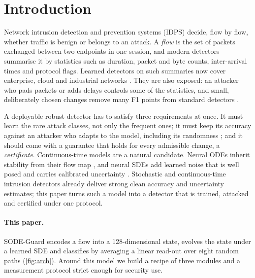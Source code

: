 \documentclass{article}
\theoremstyle{definition}
\begin{document}
\section{Introduction}\label{sec:intro}
Network intrusion detection and prevention systems (IDPS) decide, flow by flow,
whether traffic is benign or belongs to an attack. A \emph{flow} is the set of
packets exchanged between two endpoints in one session, and modern detectors
summarise it by statistics such as duration, packet and byte counts,
inter-arrival times and protocol flags. Learned detectors on such summaries now
cover enterprise, cloud and industrial networks
\citep{lo2022egraphsage,wu2022rtids,anaedevha2026mstgnn}.
They are also exposed: an attacker who pads packets or adds delays controls
some of the statistics, and small, deliberately chosen changes remove many F1
points from standard detectors \citep{ennaji2024advsurvey,vitorino2024advbench,anaedevha2024robust}.

A deployable robust detector has to satisfy three requirements at once. It must
learn the rare attack classes, not only the frequent ones; it must keep its
accuracy against an attacker who adapts to the model, including its
randomness \citep{athalye2018obfuscated,carlini2019evaluating}; and it should
come with a guarantee that holds for every admissible change, a
\emph{certificate}. Continuous-time models are a natural candidate. Neural ODEs
inherit stability from their flow map \citep{kang2021sodef}, and neural SDEs
\citep{tzen2019nsde,li2020scalable} add learned noise that is well posed and
carries calibrated uncertainty \citep{oh2024stablesde,liu2020sdenoise}.
Stochastic and continuous-time intrusion detectors
\citep{anaedevha2026ode,anaedevha2026mstgnn} already deliver
strong clean accuracy and uncertainty estimates; this paper turns such a model
into a detector that is trained, attacked and certified under one protocol.

\paragraph{This paper.} SODE-Guard encodes a flow into a 128-dimensional state,
evolves the state under a learned SDE and classifies by averaging a linear
read-out over eight random paths (\cref{fig:arch}). Around this model we build
a recipe of three modules and a measurement protocol strict enough for
security use.
\end{document}
